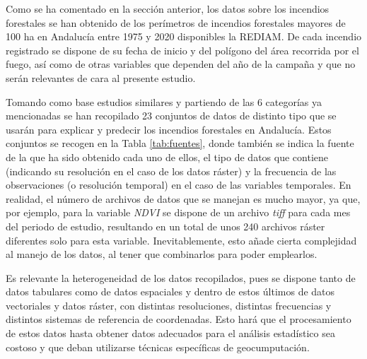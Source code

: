 \documentclass[12pt,a4paper,]{book}
\numberwithin{dummy}{section}
\theoremstyle{ocrenumbox}
\theoremstyle{blacknumex}
\theoremstyle{blacknumbox}
\theoremstyle{ocrenum}
\theoremstyle{ocrenum}
\begin{document}
Como se ha comentado en la sección anterior, los datos sobre los
incendios forestales se han obtenido de los perímetros de incendios
forestales mayores de 100 ha en Andalucía entre 1975 y 2020 disponibles
la REDIAM. De cada incendio registrado se dispone de su fecha de inicio
y del polígono del área recorrida por el fuego, así como de otras
variables que dependen del año de la campaña y que no serán relevantes
de cara al presente estudio.

Tomando como base estudios similares \citep[\citet{SAYAD2019130},
\citet{stojanova2012estimating}]{incendiosAndalucia} y partiendo de las
6 categorías ya mencionadas se han recopilado 23 conjuntos de datos de
distinto tipo que se usarán para explicar y predecir los incendios
forestales en Andalucía. Estos conjuntos se recogen en la Tabla
\ref{tab:fuentes}, donde también se indica la fuente de la que ha sido
obtenido cada uno de ellos, el tipo de datos que contiene (indicando su
resolución en el caso de los datos ráster) y la frecuencia de las
observaciones (o resolución temporal) en el caso de las variables
temporales. En realidad, el número de archivos de datos que se manejan
es mucho mayor, ya que, por ejemplo, para la variable \emph{NDVI} se
dispone de un archivo \emph{tiff} para cada mes del periodo de estudio,
resultando en un total de unos 240 archivos ráster diferentes solo para
esta variable. Inevitablemente, esto añade cierta complejidad al manejo
de los datos, al tener que combinarlos para poder emplearlos.

Es relevante la heterogeneidad de los datos recopilados, pues se dispone
tanto de datos tabulares como de datos espaciales y dentro de estos
últimos de datos vectoriales y datos ráster, con distintas resoluciones,
distintas frecuencias y distintos sistemas de referencia de coordenadas.
Esto hará que el procesamiento de estos datos hasta obtener datos
adecuados para el análisis estadístico sea costoso y que deban
utilizarse técnicas específicas de geocumputación.
\end{document}
